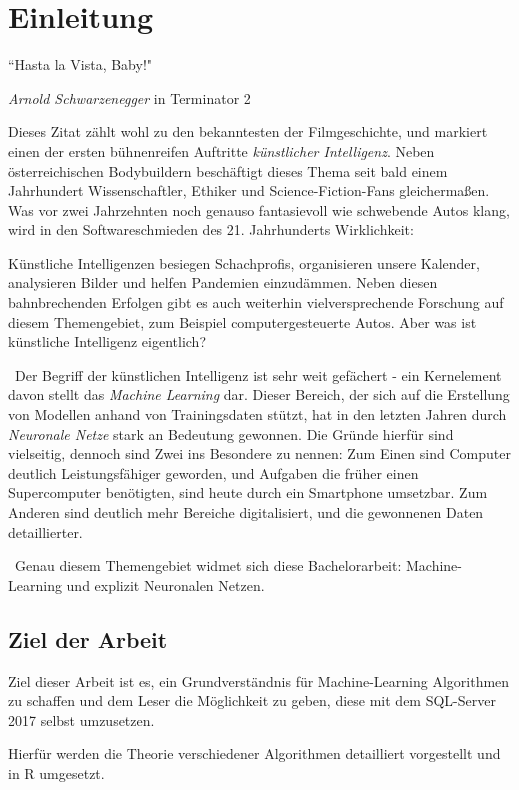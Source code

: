 \chapter{Einleitung}
\label{cha:Einleitung}
\setlength{\epigraphwidth}{4in}
\epigraph{“Hasta la Vista, Baby!"}{\textit{Arnold Schwarzenegger} \textup{ in Terminator 2}}

Dieses Zitat zählt wohl zu den bekanntesten der Filmgeschichte, und markiert einen der ersten bühnenreifen Auftritte \textit{künstlicher Intelligenz}. Neben österreichischen Bodybuildern beschäftigt dieses Thema seit bald einem Jahrhundert Wissenschaftler, Ethiker und Science-Fiction-Fans gleichermaßen. Was vor zwei Jahrzehnten noch genauso fantasievoll wie schwebende Autos klang, wird in den Softwareschmieden des 21. Jahrhunderts Wirklichkeit: 

Künstliche Intelligenzen besiegen Schachprofis, organisieren unsere Kalender, analysieren Bilder und helfen Pandemien einzudämmen. Neben diesen bahnbrechenden Erfolgen gibt es auch weiterhin vielversprechende Forschung auf diesem Themengebiet, zum Beispiel computergesteuerte Autos. Aber was ist künstliche Intelligenz eigentlich?

~\newline Der Begriff der künstlichen Intelligenz ist sehr weit gefächert - ein Kernelement davon stellt das \textit{Machine Learning} dar. Dieser Bereich, der sich auf die Erstellung von Modellen anhand von Trainingsdaten stützt, hat in den letzten Jahren durch \textit{Neuronale Netze} stark an Bedeutung gewonnen. Die Gründe hierfür sind vielseitig, dennoch sind Zwei ins Besondere zu nennen: Zum Einen sind Computer deutlich Leistungsfähiger geworden, und Aufgaben die früher einen Supercomputer benötigten, sind heute durch ein Smartphone umsetzbar. Zum Anderen sind deutlich mehr Bereiche digitalisiert, und die gewonnenen Daten detaillierter. 

~\newline Genau diesem Themengebiet widmet sich diese Bachelorarbeit: Machine-Learning und explizit Neuronalen Netzen. 
\section{Ziel der Arbeit}
\label{sec:ZielDerArbeit}
Ziel dieser Arbeit ist es, ein Grundverständnis für Machine-Learning Algorithmen zu schaffen und dem Leser die Möglichkeit zu geben, diese mit dem SQL-Server 2017 selbst umzusetzen. 

Hierfür werden die Theorie verschiedener Algorithmen detailliert vorgestellt und in R umgesetzt. 

